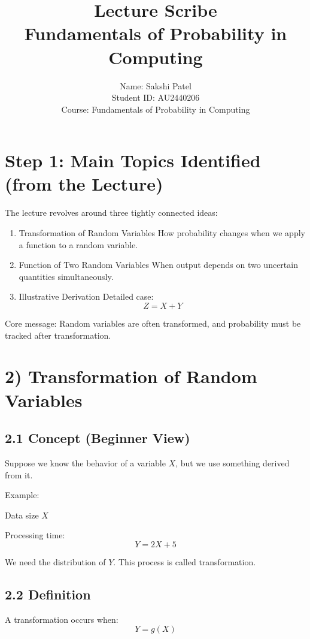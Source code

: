 \documentclass[12pt,a4paper]{article}
\title{\textbf{Lecture Scribe}\\Fundamentals of Probability in Computing}
\author{
Name: Sakshi Patel\\
Student ID: AU2440206\\
Course: Fundamentals of Probability in Computing\\
}
\begin{document}
\date{}
\maketitle
\newpage

\section*{Step 1: Main Topics Identified (from the Lecture)}

The lecture revolves around three tightly connected ideas:

\begin{enumerate}
\item Transformation of Random Variables  
How probability changes when we apply a function to a random variable.

\item Function of Two Random Variables  
When output depends on two uncertain quantities simultaneously.

\item Illustrative Derivation  
Detailed case:
\[
Z = X + Y
\]
\end{enumerate}

Core message: Random variables are often transformed, and probability must be tracked after transformation.

\section*{2) Transformation of Random Variables}

\subsection*{2.1 Concept (Beginner View)}

Suppose we know the behavior of a variable $X$, but we use something derived from it.

Example:

Data size $X$  

Processing time:
\[
Y = 2X + 5
\]

We need the distribution of $Y$.  
This process is called transformation.

\subsection*{2.2 Definition}

A transformation occurs when:
\[
Y = g(X)
\]
\end{document}

